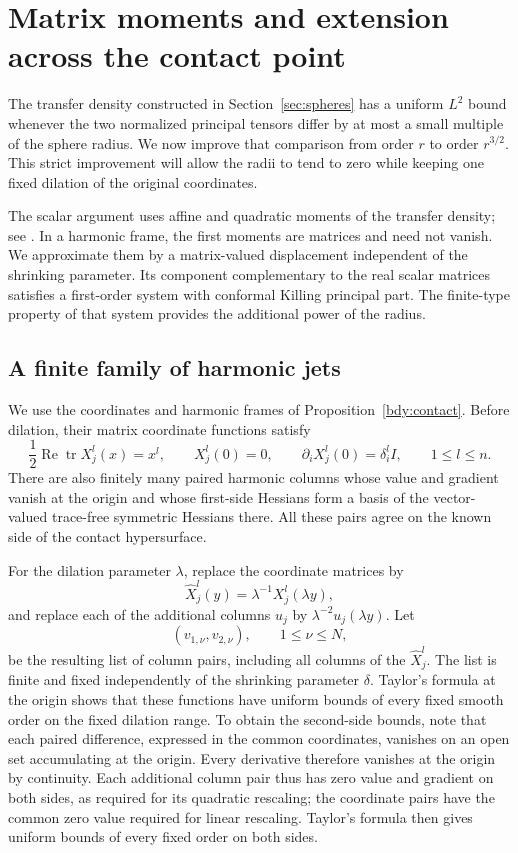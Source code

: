\section{Matrix moments and extension across the contact point}
\label{sec:matrix}
\label{mat:section}

The transfer density constructed in Section~\ref{sec:spheres} has a
uniform $L^2$ bound whenever the two normalized principal tensors differ
by at most a small multiple of the sphere radius.  We now improve that
comparison from order $r$ to order $r^{3/2}$.  This strict improvement will
allow the radii to tend to zero while keeping one fixed dilation of the
original coordinates.

The scalar argument uses affine and quadratic moments of the transfer
density; see \cite[Section~6]{ScalarCompanion2026}.  In a harmonic frame,
the first moments are matrices and need not vanish.  We approximate
them by a matrix-valued displacement independent of the shrinking
parameter.  Its component complementary
to the real scalar matrices satisfies a first-order system with
conformal Killing principal part.  The
finite-type property of that system provides the additional power of
the radius.

\subsection{A finite family of harmonic jets}

We use the coordinates and harmonic frames of
Proposition~\ref{bdy:contact}.  Before dilation, their matrix coordinate
functions satisfy
\[
 \frac12\operatorname{Re}\operatorname{tr}X_j^l(x)=x^l,
 \qquad X_j^l(0)=0,
 \qquad \partial_iX_j^l(0)=\delta_i^l I,
 \qquad 1\le l\le n.
\]
There are also finitely many paired harmonic columns whose value and
gradient vanish at the origin and whose first-side Hessians form a
basis of the vector-valued trace-free symmetric Hessians there.  All
these pairs agree on the known side of the contact hypersurface.

For the dilation parameter $\lambda$, replace the coordinate matrices
by
\begin{equation}
 \widehat X_j^l(y)=\lambda^{-1}X_j^l(\lambda y),
 \label{mat:renormalized-coordinates}
\end{equation}
and replace each of the additional columns $u_j$ by
$\lambda^{-2}u_j(\lambda y)$.  Let
\[
 (v_{1,\nu},v_{2,\nu}),\qquad 1\le\nu\le N,
\]
be the resulting list of column pairs, including all columns of the
$\widehat X_j^l$.  The list is finite and fixed independently of the
shrinking parameter $\delta$.  Taylor's formula at the origin shows
that these functions have uniform bounds of every fixed smooth order
on the fixed dilation range.  To obtain the second-side bounds, note
that each paired difference, expressed in the common coordinates,
vanishes on an open set accumulating at the origin.  Every derivative
therefore vanishes at the origin by continuity.  Each additional
column pair thus has zero value and gradient on both sides, as
required for its quadratic rescaling; the coordinate pairs have the
common zero value required for linear rescaling.  Taylor's formula
then gives uniform bounds of every fixed order on both sides.

